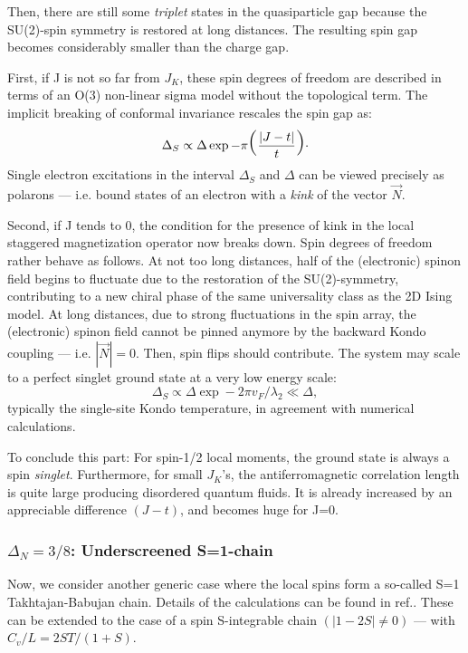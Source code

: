 Then, there are still some {\it triplet} states in the 
quasiparticle gap because the SU(2)-spin symmetry is 
restored at long distances. The resulting spin gap becomes considerably
smaller than the charge gap\cite{Zachar_KLM}.

First, 
if J is not so far from $J_K$, these spin degrees of freedom are described in
terms of an O(3) non-linear sigma model without the topological term. The
implicit breaking of conformal invariance rescales the spin gap as:
\begin{equation}
\Delta_S\propto \Delta \exp-{\pi
  \hbox{\huge(}\frac{|J-t|}{t}\hbox{\huge)}}\cdot 
\end{equation}
Single electron excitations in 
the interval $\Delta_S$ and $\Delta$ can be viewed
precisely as polarons --- i.e. bound states of an electron with a 
\emph{kink} of the vector $\vec{N}$\cite{Tsvelik_charge}. 

Second, if J tends to 0, the condition for the 
presence of kink in the local staggered
magnetization operator now breaks down. Spin degrees of freedom rather behave
as follows\cite{KLH_Ising}. At not too long distances,  
half of the (electronic) spinon field begins
to fluctuate due to the restoration of the
SU(2)-symmetry, contributing to a new chiral phase of the same
universality class as the 2D Ising model. 
At long distances, due to
strong fluctuations in the spin array, the (electronic)
spinon field cannot be pinned anymore by
the backward Kondo coupling --- i.e. $|\vec{N}|=0$.
Then, spin flips should contribute. The system may scale to a 
perfect singlet ground state at a very low energy scale:
\begin{equation}
\label{impurity}
\Delta_S\propto\Delta\exp-2\pi v_F/\lambda_2\ll\Delta,
\end{equation} 
typically the single-site Kondo temperature, in
agreement with numerical calculations\cite{Ueda_review}.

To conclude this part: For spin-1/2 local moments, 
the ground state is always a spin
{\it singlet}. Furthermore, for small
$J_K$'s, the antiferromagnetic correlation length is quite large producing
disordered quantum fluids. It is already increased
by an appreciable difference $(J-t)$, and becomes huge for J=0.

\subsubsection{$\Delta_N=3/8$: Underscreened S=1-chain}

Now, we consider another generic
case where the local spins form a so-called
S=1 Takhtajan-Babujan chain. Details of the calculations can be found 
in ref.\cite{KLH_underscreen}. These can be extended to the case of a spin 
S-integrable chain $(|1-2S|\neq 0)$ --- with
$C_v/L=2ST/(1+S)$\cite{KLH_unpublished,NE}.

